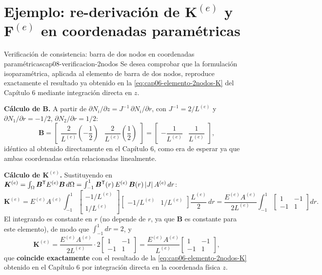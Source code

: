 \section{Ejemplo: re-derivación de \texorpdfstring{$\bm K^{(e)}$}{K} y \texorpdfstring{$\bm F^{(e)}$}{F} en coordenadas paramétricas}

\begin{ejemplo}{Verificación de consistencia: barra de dos nodos en coordenadas paramétricas}{cap08-verificacion-2nodos}
Se desea comprobar que la formulación isoparamétrica, aplicada al elemento de barra de dos nodos, reproduce exactamente el resultado ya obtenido en la \cref{eq:cap06-elemento-2nodos-K} del Capítulo 6 mediante integración directa en $z$.

\textbf{Cálculo de $\bm B$.} A partir de $\partial N_i/\partial z = J^{-1}\,\partial N_i/\partial r$, con $J^{-1}=2/L^{(e)}$ y $\partial N_1/\partial r=-1/2$, $\partial N_2/\partial r=1/2$:
\[
\bm B = \begin{bmatrix} \dfrac{2}{L^{(e)}}\left(-\dfrac12\right) & \dfrac{2}{L^{(e)}}\left(\dfrac12\right) \end{bmatrix} = \begin{bmatrix} -\dfrac{1}{L^{(e)}} & \dfrac{1}{L^{(e)}} \end{bmatrix} ,
\]
idéntico al obtenido directamente en el Capítulo 6, como era de esperar ya que ambas coordenadas están relacionadas linealmente.

\textbf{Cálculo de $\bm K^{(e)}$.} Sustituyendo en $\bm K^{(e)}=\int_\Omega \bm B^{\mathsf T}E^{(e)}\bm B\,d\Omega = \int_{-1}^{1}\bm B^{\mathsf T}(r)\,E^{(e)}\,\bm B(r)\,\abs{J}\,A^{(e)}\,dr$:
\[
\bm K^{(e)} = E^{(e)}A^{(e)} \int_{-1}^{1} \begin{bmatrix} -1/L^{(e)} \\ 1/L^{(e)} \end{bmatrix}\begin{bmatrix} -1/L^{(e)} & 1/L^{(e)} \end{bmatrix} \frac{L^{(e)}}{2}\,dr
= \frac{E^{(e)}A^{(e)}}{2L^{(e)}}\int_{-1}^{1}\begin{bmatrix}1&-1\\-1&1\end{bmatrix} dr .
\]
El integrando es constante en $r$ (no depende de $r$, ya que $\bm B$ es constante para este elemento), de modo que $\int_{-1}^1 dr = 2$, y
\[
\bm K^{(e)} = \frac{E^{(e)}A^{(e)}}{2L^{(e)}}\cdot 2\begin{bmatrix}1&-1\\-1&1\end{bmatrix} = \frac{E^{(e)}A^{(e)}}{L^{(e)}}\begin{bmatrix}1&-1\\-1&1\end{bmatrix} ,
\]
que \textbf{coincide exactamente} con el resultado de la \cref{eq:cap06-elemento-2nodos-K} obtenido en el Capítulo 6 por integración directa en la coordenada física $z$.


\end{ejemplo}
